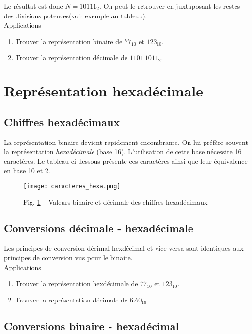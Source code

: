 \documentclass[11pt, french]{article}
\makeatletter
\def\maxwidth{\ifdim\Gin@nat@width>\linewidth\linewidth
    \else\Gin@nat@width\fi}
\let\Oldincludegraphics\includegraphics
\renewcommand{\includegraphics}[1]{\Oldincludegraphics[width=.8\maxwidth]{#1}}
\makeatother
\begin{document}
    
    Le résultat est donc \(N=10111_2\). On peut le retrouver en juxtaposant
les restes des divisions \og potences\fg (voir exemple au tableau).\\
Applications
\begin{enumerate}
\item Trouver la représentation binaire de \(77_{10}\) et \(123_{10}\). 
\item Trouver la représentation décimale de \(1101\ 1011_2\).
\end{enumerate}

    \hypertarget{repruxe9sentation-hexaduxe9cimale}{%
\section{Représentation
hexadécimale}\label{repruxe9sentation-hexaduxe9cimale}}

    \hypertarget{Chiffres-hexadecimaux}{%
\subsection{Chiffres hexadécimaux}\label{Chiffres-hexadecimaux}}

La représentation binaire devient rapidement encombrante. On lui préfère
souvent la représentation \emph{hexadécimale} (base 16). L'utilisation
de cette base nécessite 16 caractères. Le tableau ci-dessous présente
ces caractères ainsi que leur équivalence en base 10 et 2.

\begin{figure}[h]
	\begin{center}
		\texttt{[image: caracteres\_hexa.png]} 
	\end{center}
	\caption{Fig. \ref{fig:tabchiffres} -- Valeurs binaire et décimale des chiffres hexadécimaux}
	\label{fig:tabchiffres}
\end{figure}
    \hypertarget{Conversion-decimal-hexa}{%
\subsection{Conversions décimale - hexadécimale}\label{Conversion-decimal-hexa}}
Les principes de conversion décimal-hexdécimal et vice-versa
sont identiques aux principes de conversion vus pour le binaire.\\
Applications 
\begin{enumerate}
\item Trouver la représentation hexdécimale de \(77_{10}\) et
\(123_{10}\). 
\item Trouver la représentation décimale de \(6A0_{16}\).
\end{enumerate}
\hypertarget{conversions-binaire---hexaduxe9cimal}{%
\subsection{Conversions binaire -
hexadécimal}\label{conversions-binaire---hexaduxe9cimal}}
\end{document}
